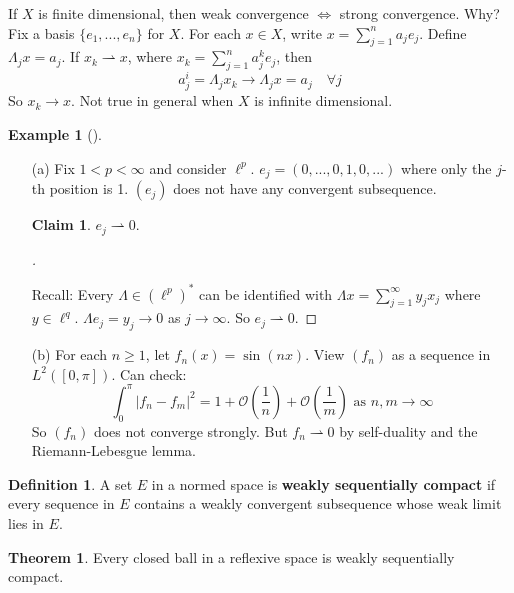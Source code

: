 \documentclass{article}
\theoremstyle{definition}
\newtheorem{thm}{Theorem}
\newtheorem{ex}{Example}
\newtheorem{dfn}{Definition}
\newtheorem*{clm}{Claim}
\newenvironment{proofs}[1][\proofname]{%
  \begin{proof}[#1]$ $\par\nobreak\ignorespaces
}{%
  \end{proof}
}
\newenvironment{exs}[1][]{%
  \begin{ex}[#1]$ $\par\nobreak\ignorespaces
}{%
  \end{ex}
}
\renewcommand{\O}{\mathcal O}
\newcommand{\Lra}{\Leftrightarrow}
\newcommand{\ru}{\rightharpoonup}
\begin{document}
If $X$ is finite dimensional, then weak convergence $\Lra$ strong convergence.
Why? Fix a basis $\{e_1, ..., e_n\}$ for $X$.
For each $x \in X$, write $x = \sum_{j = 1}^n a_j e_j$.
Define $\Lambda_j x = a_j$.
If $x_k \ru x$, where $x_k = \sum_{j = 1}^n a_j^k e_j$, then 
\[
	a_j^i = \Lambda_j x_k \to \Lambda_j x = a_j \quad \forall j
\]
So $x_k \to x$.
Not true in general when $X$ is infinite dimensional.
\begin{exs}
	\begin{enumerate}
		\item[(a)] Fix $1 < p < \infty$ and consider $\ell^p$.
			$e_j = (0, ..., 0, 1, 0, ...)$ where only the $j$-th position is 1.
			$(e_j)$ does not have any convergent subsequence.
			\begin{clm}
				$e_j \ru 0$.
			\end{clm}

			\begin{proofs}
				Recall: Every $\Lambda \in (\ell^p)^*$ can be identified with $\Lambda x = \sum_{j = 1}^\infty y_j x_j$ where $y \in \ell^q$.
				$\Lambda e_j = y_j \to 0$ as $j \to \infty$.
				So $e_j \ru 0$.
			\end{proofs}

		\item[(b)] For each $n \geq 1$, let $f_n(x) = \sin(nx)$.
			View $(f_n)$ as a sequence in $L^2([0, \pi])$.
			Can check:
			\[
				\int_0^\pi |f_n - f_m|^2 = 1 + \O\left(\frac{1}{n}\right) + \O \left( \frac{1}{m} \right) \text{ as } n, m \to \infty
			\]
			So $(f_n)$ does not converge strongly.
			But $f_n \ru 0$ by self-duality and the Riemann-Lebesgue lemma.
	\end{enumerate}
\end{exs}

\begin{dfn}
	A set $E$ in a normed space is \textbf{weakly sequentially compact} if every sequence in $E$ contains a weakly convergent subsequence whose weak limit lies in $E$. 
\end{dfn}

\begin{thm}
	Every closed ball in a reflexive space is weakly sequentially compact.
\end{thm}
\end{document}
